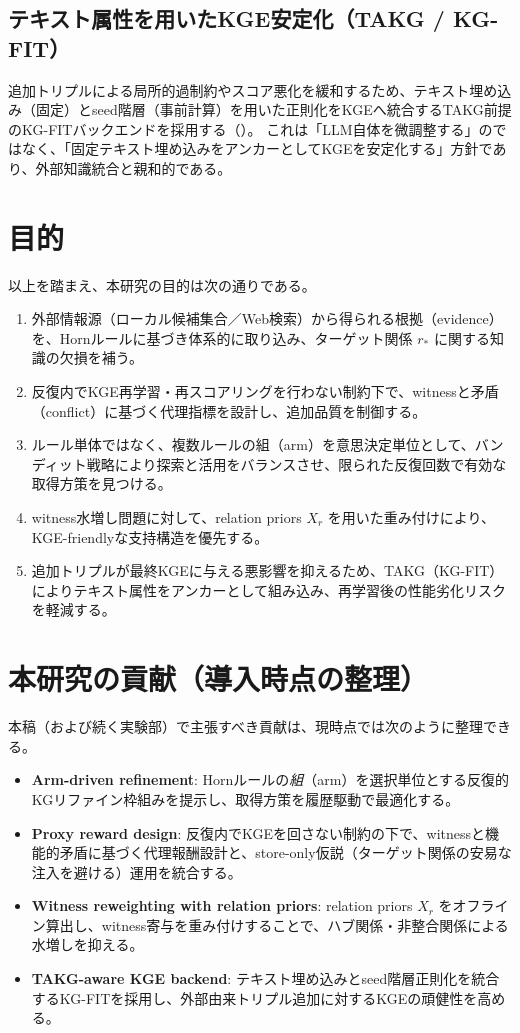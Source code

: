 \documentclass[11pt]{article}
\begin{document}
\subsection{テキスト属性を用いたKGE安定化（TAKG / KG-FIT）}
追加トリプルによる局所的過制約やスコア悪化を緩和するため、テキスト埋め込み（固定）とseed階層（事前計算）を用いた正則化をKGEへ統合するTAKG前提のKG-FITバックエンドを採用する（\cite{rule_takg_kgfit}）。
これは「LLM自体を微調整する」のではなく、「固定テキスト埋め込みをアンカーとしてKGEを安定化する」方針であり、外部知識統合と親和的である。

\section{目的}
以上を踏まえ、本研究の目的は次の通りである。

\begin{enumerate}
  \item 外部情報源（ローカル候補集合／Web検索）から得られる根拠（evidence）を、Hornルールに基づき体系的に取り込み、ターゲット関係 $r_*$ に関する知識の欠損を補う。
  \item 反復内でKGE再学習・再スコアリングを行わない制約下で、witnessと矛盾（conflict）に基づく代理指標を設計し、追加品質を制御する。
  \item ルール単体ではなく、複数ルールの組（arm）を意思決定単位として、バンディット戦略により探索と活用をバランスさせ、限られた反復回数で有効な取得方策を見つける。
  \item witness水増し問題に対して、relation priors $X_r$ を用いた重み付けにより、KGE-friendlyな支持構造を優先する。
  \item 追加トリプルが最終KGEに与える悪影響を抑えるため、TAKG（KG-FIT）によりテキスト属性をアンカーとして組み込み、再学習後の性能劣化リスクを軽減する。
\end{enumerate}

\section{本研究の貢献（導入時点の整理）}
本稿（および続く実験部）で主張すべき貢献は、現時点では次のように整理できる。

\begin{itemize}
  \item \textbf{Arm-driven refinement}: Hornルールの\emph{組}（arm）を選択単位とする反復的KGリファイン枠組みを提示し、取得方策を履歴駆動で最適化する。
  \item \textbf{Proxy reward design}: 反復内でKGEを回さない制約の下で、witnessと機能的矛盾に基づく代理報酬設計と、store-only仮説（ターゲット関係の安易な注入を避ける）運用を統合する。
  \item \textbf{Witness reweighting with relation priors}: relation priors $X_r$ をオフライン算出し、witness寄与を重み付けすることで、ハブ関係・非整合関係による水増しを抑える。
  \item \textbf{TAKG-aware KGE backend}: テキスト埋め込みとseed階層正則化を統合するKG-FITを採用し、外部由来トリプル追加に対するKGEの頑健性を高める。
\end{itemize}
\end{document}
